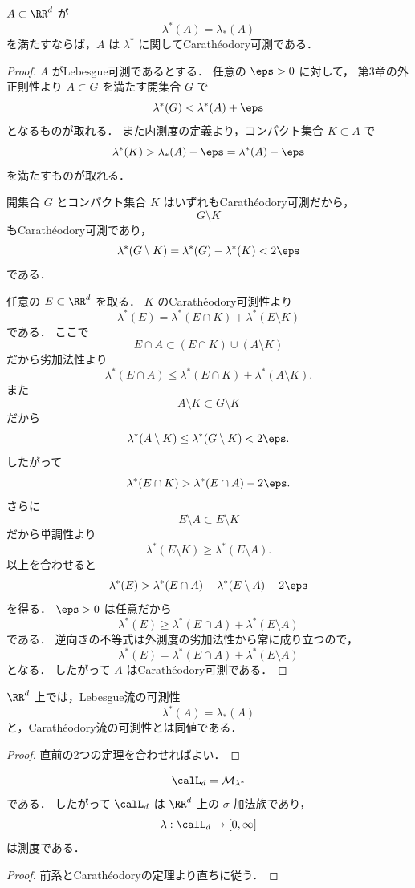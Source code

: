 \begin{theorem}[Lebesgue可測ならCarathéodory可測]
$A \subset \RR^d$ が
\[
\lambda^*(A)=\lambda_*(A)
\]
を満たすならば，$A$ は $\lambda^*$ に関してCarathéodory可測である．
\end{theorem}
\begin{proof}
$A$ がLebesgue可測であるとする．
任意の $\eps>0$ に対して，
第3章の外正則性より $A \subset G$ を満たす開集合 $G$ で
\[
\lambda^*(G)<\lambda^*(A)+\eps
\]
となるものが取れる．
また内測度の定義より，コンパクト集合 $K \subset A$ で
\[
\lambda^*(K)>\lambda_*(A)-\eps=\lambda^*(A)-\eps
\]
を満たすものが取れる．

開集合 $G$ とコンパクト集合 $K$ はいずれもCarathéodory可測だから，
\[
G\setminus K
\]
もCarathéodory可測であり，
\[
\lambda^*(G\setminus K)=\lambda^*(G)-\lambda^*(K)<2\eps
\]
である．

任意の $E \subset \RR^d$ を取る．
$K$ のCarathéodory可測性より
\[
\lambda^*(E)=\lambda^*(E\cap K)+\lambda^*(E\setminus K)
\]
である．
ここで
\[
E\cap A \subset (E\cap K)\cup(A\setminus K)
\]
だから劣加法性より
\[
\lambda^*(E\cap A)\le \lambda^*(E\cap K)+\lambda^*(A\setminus K).
\]
また
\[
A\setminus K \subset G\setminus K
\]
だから
\[
\lambda^*(A\setminus K)\le \lambda^*(G\setminus K)<2\eps.
\]
したがって
\[
\lambda^*(E\cap K)>\lambda^*(E\cap A)-2\eps.
\]
さらに
\[
E\setminus A \subset E\setminus K
\]
だから単調性より
\[
\lambda^*(E\setminus K)\ge \lambda^*(E\setminus A).
\]
以上を合わせると
\[
\lambda^*(E)
>
\lambda^*(E\cap A)+\lambda^*(E\setminus A)-2\eps
\]
を得る．
$\eps>0$ は任意だから
\[
\lambda^*(E)\ge \lambda^*(E\cap A)+\lambda^*(E\setminus A)
\]
である．
逆向きの不等式は外測度の劣加法性から常に成り立つので，
\[
\lambda^*(E)
=
\lambda^*(E\cap A)+\lambda^*(E\setminus A)
\]
となる．
したがって $A$ はCarathéodory可測である．
\end{proof}

\begin{corollary}[2つの定義の一致]
$\RR^d$ 上では，Lebesgue流の可測性
\[
\lambda^*(A)=\lambda_*(A)
\]
と，Carathéodory流の可測性とは同値である．
\end{corollary}
\begin{proof}
直前の2つの定理を合わせればよい．
\end{proof}

\begin{corollary}[第5章の基本定理]
\[
\calL_d
=
\mathcal M_{\lambda^*}
\]
である．
したがって $\calL_d$ は $\RR^d$ 上の $\sigma$-加法族であり，
\[
\lambda:\calL_d\to[0,\infty]
\]
は測度である．
\end{corollary}
\begin{proof}
前系とCarathéodoryの定理より直ちに従う．
\end{proof}

